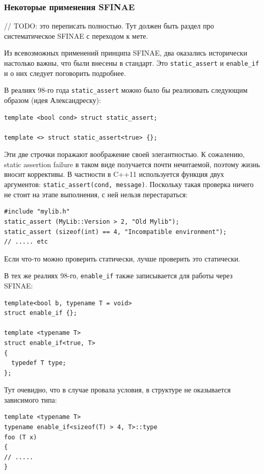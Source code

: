 \documentclass[a4paper,12pt,oneside]{article}
\begin{document}
\subsubsection{Некоторые применения SFINAE}

// TODO: это переписать полностью. Тут должен быть раздел про систематическое SFINAE с переходом к мете.

Из всевозможных применений принципа SFINAE, два оказались исторически настолько важны, что были внесены в стандарт. Это \lstinline!static_assert! и \lstinline!enable_if! и о них следует поговорить подробнее.

В реалиях 98-го года \lstinline!static_assert! можно было бы реализовать следующим образом (идея Александреску):

\begin{lstlisting}
template <bool cond> struct static_assert;

template <> struct static_assert<true> {};
\end{lstlisting}

Эти две строчки поражают воображение своей элегантностью. К сожалению, static assertion failure в таком виде получается почти нечитаемой, поэтому жизнь вносит коррективы. В частности в C++11 используется функция двух аргументов: \lstinline!static_assert(cond, message)!. Поскольку такая проверка ничего не стоит на этапе выполнения, с ней нельзя перестараться:

\begin{lstlisting}
#include "mylib.h"
static_assert (MyLib::Version > 2, "Old Mylib");
static_assert (sizeof(int) == 4, "Incompatible environment");
// ..... etc
\end{lstlisting}

Если что-то можно проверить статически, лучше проверить это статически.

В тех же реалиях 98-го, \lstinline!enable_if! также записывается для работы через SFINAE:

\begin{lstlisting}
template<bool b, typename T = void>
struct enable_if {};

template <typename T>
struct enable_if<true, T> 
{
  typedef T type;
};
\end{lstlisting}

Тут очевидно, что в случае провала условия, в структуре не оказывается зависимого типа:

\begin{lstlisting}
template <typename T>
typename enable_if<sizeof(T) > 4, T>::type
foo (T x) 
{ 
// .....
}
\end{lstlisting}
\end{document}
